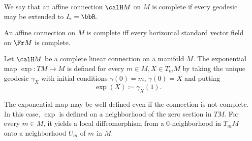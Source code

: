 We say that an affine connection $\calH M$ on $M$ is complete if every geodesic may be extended to $I_\epsilon=\bbR$.

\begin{cor}[{{\cite[Cor.~2.1.24]{RS2}}}]\label{cor 2.1.24 RS2}
    An affine connection on $M$ is complete iff every horizontal standard vector field on $\Fr M$ is complete.
\end{cor}


\begin{defn}
    Let $\calH M$ be a complete linear connection on a manifold $M$. The exponential map $\exp: TM\to M$ is defined for every $m\in M, X\in T_mM$ by taking the unique geodesic $\gamma_X$ with initial conditions $\gamma(0)=m$, $\dot\gamma(0)=X$ and putting 
    \[\exp(X)\coloneqq \gamma_X(1).\]
\end{defn}

\begin{rem}
    The exponential map may be well-defined even if the connection is not complete. In this case, $\exp$ is defined on a neighborhood of the zero section in $TM$. For every $m\in M$, it yields a local diffeomorphism from a $0$-neighborhood in $T_m M$ onto a neighborhood $U_m$ of $m$ in $M$.
\end{rem}



